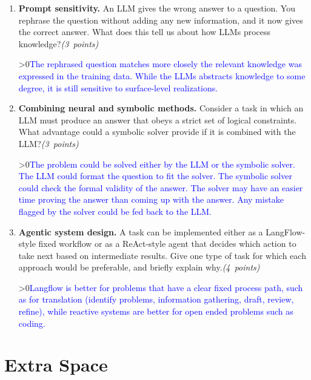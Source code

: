 \documentclass[12pt]{article}
\newcounter{showsolution}
\newcommand{\solution}[2]{\ifnum\value{showsolution}>0{\textcolor{blue}{#1}}\else{#2}\fi}
\begin{document}
\begin{enumerate}
\item {\bf Prompt sensitivity.} 
An LLM gives the wrong answer to a question. You rephrase the question without adding any new information, and it now gives the correct answer. What does this tell us about how LLMs process knowledge?\hfill{\em (3~points)}

\solution{The rephrased question matches more closely the relevant knowledge was expressed in the training data. While the LLMs abstracts knowledge to some degree, it is still sensitive to surface-level realizations.}{\vspace{4cm}}

\item {\bf Combining neural and symbolic methods.} 
Consider a task in which an LLM must produce an answer that obeys a strict set of logical constraints. What advantage could a symbolic solver provide if it is combined with the LLM?\hfill{\em (3~points)}

\solution{The problem could be solved either by the LLM or the symbolic solver. The LLM could format the question to fit the solver. The symbolic solver could check the formal validity of the answer. The solver may have an easier time proving the answer than coming up with the answer. Any mistake flagged by the solver could be fed back to the LLM.}{\vspace{4cm}}

\item {\bf Agentic system design.}
A task can be implemented either as a LangFlow-style fixed workflow or as a ReAct-style agent that decides which action to take next based on intermediate results. Give one type of task for which each approach would be preferable, and briefly explain why.\hfill{\em (4~points)}

\solution{Langflow is better for problems that have a clear fixed process path, such as for translation (identify problems, information gathering, draft, review, refine), while reactive systems are better for open ended problems such as coding.}{\vspace{4cm}}

\end{enumerate}



\newpage
\section*{Extra Space}
\newpage
\end{document}
